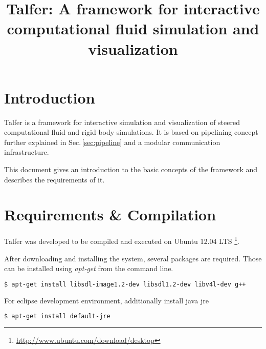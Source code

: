 \documentclass[11pt,a4paper]{article}
\begin{document}

\title{Talfer: A framework for interactive computational fluid simulation and
visualization}

\maketitle



\section{Introduction}

Talfer is a framework for interactive simulation and visualization of
steered computational fluid and rigid body simulations.
It is based on pipelining concept further explained in Sec.\,\ref{sec:pipeline}
and a modular communication infrastructure.

This document gives an introduction to the basic concepts of the framework and
describes the requirements of it.



\section{Requirements \& Compilation}

Talfer was developed to be compiled and executed on Ubuntu 12.04 LTS
\footnote{\url{http://www.ubuntu.com/download/desktop}}.

After downloading and installing the system, several packages are required.
Those can be installed using \textit{apt-get} from the command line.

\begin{lstlisting}[language=sh]
$ apt-get install libsdl-image1.2-dev libsdl1.2-dev libv4l-dev g++
\end{lstlisting}

For eclipse development environment, additionally install java jre
\begin{lstlisting}[language=sh]
$ apt-get install default-jre
\end{lstlisting}
\end{document}
